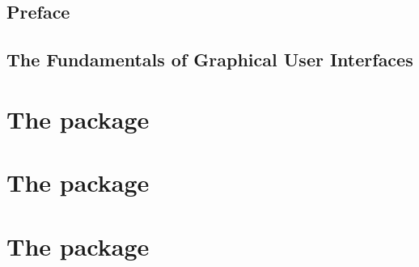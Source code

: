 \documentclass[letterpaper,10pt,twoside,onecolumn,showtrims,final,openright]{memoir}
\begin{document}
\thispagestyle{empty}
%

\frontmatter

\chapter*{Preface}
\label{chap:preface}

\newpage


\setcounter{tocdepth}{3}
\tableofcontents
\newpage



\graphicspath{
  {ch-Preface/}
  {ch-GUIBasics/}
  {ch-ProgrammingPractices/}
  {ch-gWidgets/}
  {ch-RGtk2/}
  {ch-Qt/}
  {ch-tcltk/}
}


\mainmatter
\chapter{The Fundamentals of Graphical User Interfaces}
\label{chap:GUIBasics}







\part{The  package}
\label{chap:gWidgets-intro}




\part{The  package}
\label{chap:RGtk2}


\part{The  package}
\label{chap:Qt}

\end{document}
